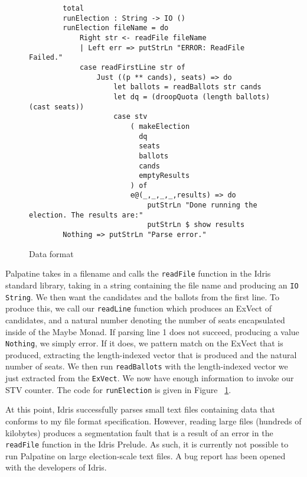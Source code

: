 \begin{figure}[ht!!!!!!!]
    \caption{Data format}
    \label{main_code}
    \begin{lstlisting}
        total
        runElection : String -> IO ()
        runElection fileName = do
            Right str <- readFile fileName
            | Left err => putStrLn "ERROR: ReadFile Failed."
            case readFirstLine str of
                Just ((p ** cands), seats) => do 
                    let ballots = readBallots str cands
                    let dq = (droopQuota (length ballots) (cast seats))
                    case stv
                        ( makeElection 
                          dq
                          seats
                          ballots
                          cands
                          emptyResults
                        ) of
                        e@(_,_,_,_,results) => do
                            putStrLn "Done running the election. The results are:"
                            putStrLn $ show results
        Nothing => putStrLn "Parse error."
    \end{lstlisting}
\end{figure}

Palpatine takes in a filename and calls the \texttt{readFile} function in the
Idris standard library, taking in a string containing the file name and
producing an \texttt{IO String}. We then want the candidates and the ballots
from the first line. To produce this, we call our \texttt{readLine} function
which produces an ExVect of candidates, and a natural number denoting the number
of seats encapsulated inside of the Maybe Monad. If parsing line 1 does not
succeed, producing a value \texttt{Nothing}, we simply error. If it does, we
pattern match on the ExVect that is produced, extracting the length-indexed
vector that is produced and the natural number of seats. We then run
\texttt{readBallots} with the length-indexed vector we just extracted from the
\texttt{ExVect}. We now have enough information to invoke our STV counter. The
code for \texttt{runElection} is given in Figure ~\ref{main_code}. 

At this point, Idris successfully parses small text files containing data that
conforms to my file format specification. However, reading large files (hundreds
of kilobytes) produces a segmentation fault that is a result of an error in the
\texttt{readFile} function in the Idris Prelude. As such, it is currently not
possible to run Palpatine on large election-scale text files. A bug
report has been opened with the developers of Idris. 